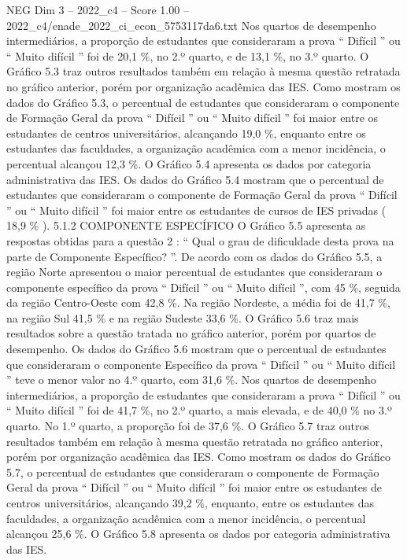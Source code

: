 \begin{textsample}{NEG Dim 3 – 2022\_c4 – Score 1.00 – 2022\_c4/enade\_2022\_ci\_econ\_5753117da6.txt}
Nos quartos de desempenho intermediários, a proporção de estudantes que consideraram a prova “ Difícil ” ou “ Muito difícil ” foi de 20,1 \%, no 2.º quarto, e de 13,1 \%, no 3.º quarto.
O Gráfico 5.3 traz outros resultados também em relação à mesma questão retratada no gráfico anterior, porém por organização acadêmica das IES.
Como mostram os dados do Gráfico 5.3, o percentual de estudantes que consideraram o componente de Formação Geral da prova “ Difícil ” ou “ Muito difícil ” foi maior entre os estudantes de centros universitários, alcançando 19,0 \%, enquanto entre os estudantes das faculdades, a organização acadêmica com a menor incidência, o percentual alcançou 12,3 \%.
O Gráfico 5.4 apresenta os dados por categoria administrativa das IES.
Os dados do Gráfico 5.4 mostram que o percentual de estudantes que consideraram o componente de Formação Geral da prova “ Difícil ” ou “ Muito difícil ” foi maior entre os estudantes de cursos de IES privadas ( 18,9 \% ). 5.1.2 COMPONENTE ESPECÍFICO O Gráfico 5.5 apresenta as respostas obtidas para a questão 2 : “ Qual o grau de dificuldade desta prova na parte de Componente Específico? ”.
De acordo com os dados do Gráfico 5.5, a região Norte apresentou o maior percentual de estudantes que consideraram o componente específico da prova “ Difícil ” ou “ Muito difícil ”, com 45 \%, seguida da região Centro-Oeste com 42,8 \%.
Na região Nordeste, a média foi de 41,7 \%, na região Sul 41,5 \% e na região Sudeste 33,6 \%.
O Gráfico 5.6 traz mais resultados sobre a questão tratada no gráfico anterior, porém por quartos de desempenho.
Os dados do Gráfico 5.6 mostram que o percentual de estudantes que consideraram o componente Específico da prova “ Difícil ” ou “ Muito difícil ” teve o menor valor no 4.º quarto, com 31,6 \%.
Nos quartos de desempenho intermediários, a proporção de estudantes que consideraram a prova “ Difícil ” ou “ Muito difícil ” foi de 41,7 \%, no 2.º quarto, a mais elevada, e de 40,0 \% no 3.º quarto.
No 1.º quarto, a proporção foi de 37,6 \%.
O Gráfico 5.7 traz outros resultados também em relação à mesma questão retratada no gráfico anterior, porém por organização acadêmica das IES.
Como mostram os dados do Gráfico 5.7, o percentual de estudantes que consideraram o componente de Formação Geral da prova “ Difícil ” ou “ Muito difícil ” foi maior entre os estudantes de centros universitários, alcançando 39,2 \%, enquanto, entre os estudantes das faculdades, a organização acadêmica com a menor incidência, o percentual alcançou 25,6 \%.
O Gráfico 5.8 apresenta os dados por categoria administrativa das IES.

\end{textsample}
